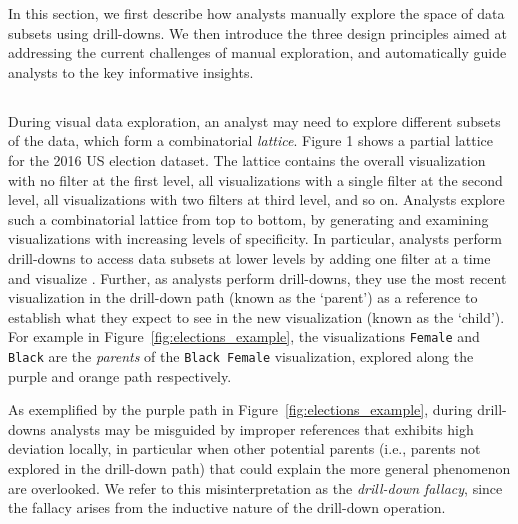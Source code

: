 In this section, we first describe how analysts manually explore the space of data subsets using drill-downs. We then introduce the three design principles aimed at addressing the current challenges of manual exploration, and automatically guide analysts to the key informative insights.
\subsection{}
During visual data exploration, an analyst may need to explore different subsets of the data, which form a combinatorial \emph{lattice}. Figure 1 shows a partial lattice for the 2016 US election dataset. The lattice contains the overall visualization with no filter at the first level, all visualizations with a single filter at the second level, all visualizations with two filters at third level, and so on. Analysts explore such a combinatorial lattice from top to bottom, by generating and examining visualizations with increasing levels of specificity. In particular, analysts perform drill-downs to access data subsets at lower levels by adding one filter at a time and visualize . Further, as analysts perform drill-downs, they use the most recent visualization in the drill-down path (known as the `parent') as a reference to establish what they expect to see in the new visualization (known as the `child'). For example in Figure~\ref{fig:elections_example}, the visualizations \texttt{Female} and \texttt{Black} are the \emph{parents} of the \texttt{Black Female} visualization, explored along the purple and orange path respectively.
\par As exemplified by the purple path in Figure~\ref{fig:elections_example}, during drill-downs analysts may be misguided by improper references that exhibits high deviation locally, in particular when other potential parents (i.e., parents not explored in the drill-down path) that could explain the more general phenomenon are overlooked. We refer to this misinterpretation as the \emph{drill-down fallacy}, since the fallacy arises from the inductive nature of the drill-down operation.
